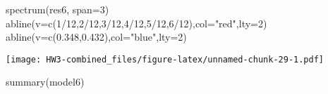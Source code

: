 \documentclass[
]{article}
\newenvironment{Shaded}{\begin{snugshade}}{\end{snugshade}}
\newcommand{\AttributeTok}[1]{\textcolor[rgb]{0.77,0.63,0.00}{#1}}
\newcommand{\DecValTok}[1]{\textcolor[rgb]{0.00,0.00,0.81}{#1}}
\newcommand{\FloatTok}[1]{\textcolor[rgb]{0.00,0.00,0.81}{#1}}
\newcommand{\FunctionTok}[1]{\textcolor[rgb]{0.00,0.00,0.00}{#1}}
\newcommand{\NormalTok}[1]{#1}
\newcommand{\SpecialCharTok}[1]{\textcolor[rgb]{0.00,0.00,0.00}{#1}}
\newcommand{\StringTok}[1]{\textcolor[rgb]{0.31,0.60,0.02}{#1}}
\begin{document}
\begin{Shaded}
\begin{Highlighting}[]
\FunctionTok{spectrum}\NormalTok{(res6, }\AttributeTok{span=}\DecValTok{3}\NormalTok{)}
\FunctionTok{abline}\NormalTok{(}\AttributeTok{v=}\FunctionTok{c}\NormalTok{(}\DecValTok{1}\SpecialCharTok{/}\DecValTok{12}\NormalTok{,}\DecValTok{2}\SpecialCharTok{/}\DecValTok{12}\NormalTok{,}\DecValTok{3}\SpecialCharTok{/}\DecValTok{12}\NormalTok{,}\DecValTok{4}\SpecialCharTok{/}\DecValTok{12}\NormalTok{,}\DecValTok{5}\SpecialCharTok{/}\DecValTok{12}\NormalTok{,}\DecValTok{6}\SpecialCharTok{/}\DecValTok{12}\NormalTok{),}\AttributeTok{col=}\StringTok{"red"}\NormalTok{,}\AttributeTok{lty=}\DecValTok{2}\NormalTok{)}
\FunctionTok{abline}\NormalTok{(}\AttributeTok{v=}\FunctionTok{c}\NormalTok{(}\FloatTok{0.348}\NormalTok{,}\FloatTok{0.432}\NormalTok{),}\AttributeTok{col=}\StringTok{"blue"}\NormalTok{,}\AttributeTok{lty=}\DecValTok{2}\NormalTok{)}
\end{Highlighting}
\end{Shaded}

\texttt{[image: HW3-combined\_files/figure-latex/unnamed-chunk-29-1.pdf]}

\begin{Shaded}
\begin{Highlighting}[]
\FunctionTok{summary}\NormalTok{(model6)}
\end{Highlighting}
\end{Shaded}
\end{document}
